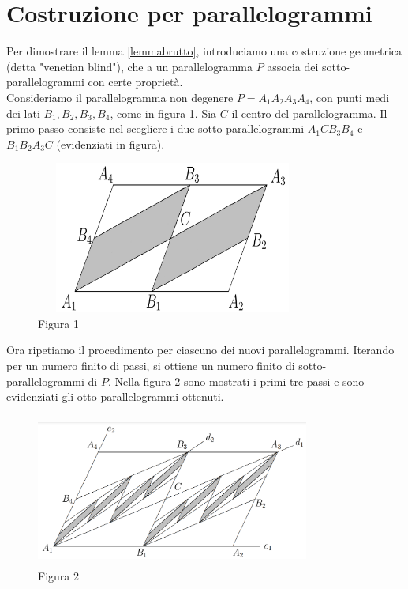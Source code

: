 \documentclass[a4paper, twoside]{article}
\newcommand{\<}{\langle}
\renewcommand{\>}{\rangle}
\begin{document}
\newpage

\section{Costruzione per parallelogrammi}

Per dimostrare il lemma \ref{lemmabrutto}, introduciamo una costruzione geometrica (detta "venetian blind"), che a un parallelogramma $P$ associa dei sotto-parallelogrammi con certe proprietà.\\
Consideriamo il parallelogramma non degenere $P=A_{1} A_{2} A_{3} A_{4}$, con punti medi dei lati $B_{1}, B_{2}, B_{3}, B_{4}$, come in figura 1. Sia $C$ il centro del parallelogramma. Il primo passo consiste nel scegliere i due sotto-parallelogrammi $A_{1} C B_{3} B_{4}$ e $B_{1} B_{2} A_{3} C$ (evidenziati in figura).


	\begin{figure} [h!]
	\includegraphics[width=9cm, height=5cm]{passo1grigio.png}
	\centering
	\caption{Figura 1}
	\end{figure}


Ora ripetiamo il procedimento per ciascuno dei nuovi parallelogrammi. Iterando per un numero finito di passi, si ottiene un numero finito di sotto-parallelogrammi di $P$. Nella figura 2 sono mostrati i primi tre passi e sono evidenziati gli otto parallelogrammi ottenuti.\\

\begin{figure} [h!]
	\includegraphics[width=9cm, height=5cm]{passi123grigio.png}
	\centering
	\caption{Figura 2}
\end{figure}
\end{document}
